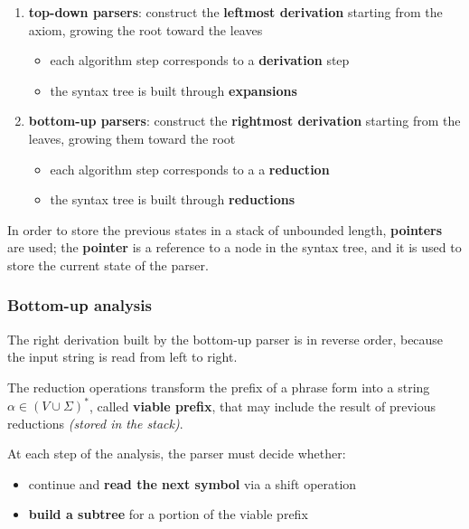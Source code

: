 \documentclass[english]{article}
\begin{document}
\begin{enumerate}
  \item \textbf{top-down parsers}: construct the \textbf{leftmost derivation} starting from the axiom, growing the root toward the leaves
        \begin{itemize}
          \item each algorithm step corresponds to a \textbf{derivation} step
          \item the syntax tree is built through \textbf{expansions}
        \end{itemize}
  \item \textbf{bottom-up parsers}: construct the \textbf{rightmost derivation} starting from the leaves, growing them toward the root
        \begin{itemize}
          \item each algorithm step corresponds to a a \textbf{reduction}
          \item the syntax tree is built through \textbf{reductions}
        \end{itemize}
\end{enumerate}

\bigskip
In order to store the previous states in a stack of unbounded length, \textbf{pointers} are used;
the \textbf{pointer} is a reference to a node in the syntax tree, and it is used to store the current state of the parser.

\subsubsection{Bottom-up analysis}

The right derivation built by the bottom-up parser is in reverse order, because the input string is read from left to right.

The reduction operations transform the prefix of a phrase form into a string \(\alpha \in \left( V \cup \Sigma \right)^\ast\), called \textbf{viable prefix}, that may include the result of previous reductions \textit{(stored in the stack)}.

At each step of the analysis, the parser must decide whether:

\begin{itemize}
  \item continue and \textbf{read the next symbol} via a shift operation
  \item \textbf{build a subtree} for a portion of the viable prefix
\end{itemize}
\end{document}
